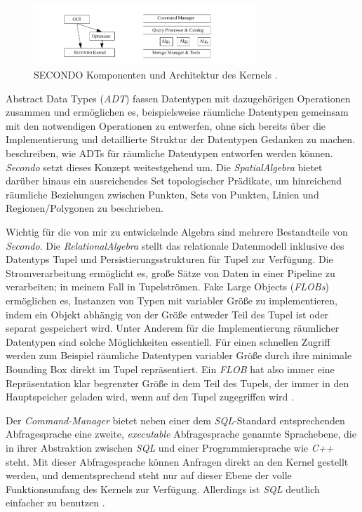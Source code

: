 \documentclass[a4paper,12pt,twoside]{article}
\newcommand{\Fb}[1]{\textit{#1}} %
\begin{document}
\begin{figure}
	\centering
	\includegraphics[width=0.75\textwidth]{Bilder/secondo.png}
	\caption{SECONDO Komponenten und Architektur des Kernels \parencite{Gueting2010}.}
	\label{img:secondo}
\end{figure}

Abstract Data Types (\Fb{ADT}) fassen Datentypen mit dazugehörigen Operationen zusammen und ermöglichen es, beispielsweise räumliche Datentypen gemeinsam mit den notwendigen Operationen zu entwerfen, ohne sich bereits über die Implementierung und detaillierte Struktur der Datentypen Gedanken zu machen. {\textcite[S. 75ff]{Rigaux2001}} beschreiben, wie ADTs für räumliche Datentypen entworfen werden können. \Fb{Secondo} setzt dieses Konzept weitestgehend um. Die \Fb{SpatialAlgebra} bietet darüber hinaus ein ausreichendes Set topologischer Prädikate, um hinreichend räumliche Beziehungen zwischen Punkten, Sets von Punkten, Linien und Regionen/Polygonen zu beschrieben.

Wichtig für die von mir zu entwickelnde Algebra sind mehrere Bestandteile von \Fb{Secondo}. Die \Fb{RelationalAlgebra} stellt das relationale Datenmodell inklusive des Datentyps Tupel und Persistierungsstrukturen für Tupel zur Verfügung. Die Stromverarbeitung ermöglicht es, große Sätze von Daten in einer Pipeline zu verarbeiten; in meinem Fall in Tupelströmen. Fake Large Objects (\Fb{FLOBs}) ermöglichen es, Instanzen von Typen mit variabler Größe zu implementieren, indem ein Objekt abhängig von der Größe entweder Teil des Tupel ist oder separat gespeichert wird. Unter Anderem für die Implementierung räumlicher Datentypen sind solche Möglichkeiten essentiell. Für einen schnellen Zugriff werden zum Beispiel räumliche Datentypen variabler Größe durch ihre minimale Bounding Box direkt im Tupel repräsentiert. Ein \Fb{FLOB} hat also immer eine Repräsentation klar begrenzter Größe in dem Teil des Tupels, der immer in den Hauptspeicher geladen wird, wenn auf den Tupel zugegriffen wird \parencite{Gueting2010}.

Der \Fb{Command-Manager} bietet neben einer dem \Fb{SQL}-Standard entsprechenden Abfragesprache eine zweite, \Fb{executable} Abfragesprache genannte Sprachebene, die in ihrer Abstraktion zwischen \Fb{SQL} und einer Programmiersprache wie \Fb{C++} steht. Mit dieser Abfragesprache können Anfragen direkt an den Kernel gestellt werden, und dementsprechend steht nur auf dieser Ebene der volle Funktionsumfang des Kernels zur Verfügung. Allerdings ist \Fb{SQL} deutlich einfacher zu benutzen \parencite{Gueting2010}. 
\end{document}
